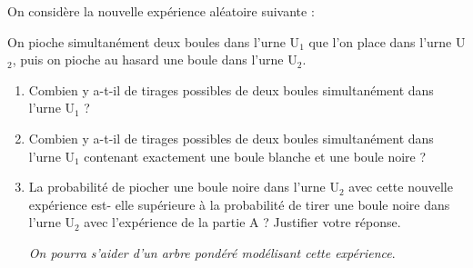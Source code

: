 \medskip

On considère la nouvelle expérience aléatoire suivante :

On pioche simultanément deux boules dans l'urne U$_1$ que l'on place dans l'urne U$_2$, puis on pioche au hasard une boule dans l'urne U$_2$.

\medskip

\begin{enumerate}
\item Combien y a-t-il de tirages possibles de deux boules simultanément dans l'urne U$_1$ ?
\item Combien y a-t-il de tirages possibles de deux boules simultanément dans l'urne U$_1$
contenant exactement une boule blanche et une boule noire ?
\item La probabilité de piocher une boule noire dans l'urne U$_2$ avec cette nouvelle expérience est- elle supérieure à la probabilité de tirer une boule noire dans l'urne U$_2$ avec l'expérience de la partie A ? Justifier votre réponse.

\emph{On pourra s'aider d'un arbre pondéré modélisant cette expérience}.
\end{enumerate}

\bigskip
